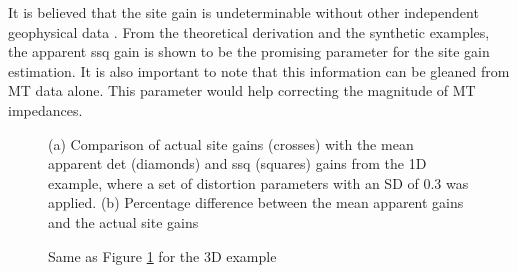 	It is believed that the site gain is undeterminable without other independent geophysical data \citep[e.g.,][]{groom1993a, bibby2005a}.
	From the theoretical derivation and the synthetic examples, the apparent ssq gain is shown to be the promising parameter for the site gain estimation. 
	It is also important to note that this information can be gleaned from MT data alone.
	This parameter would help correcting the magnitude of MT impedances.	

\begin{figure}[t]
	\centering
	\caption[Comparison of the actual and the mean apparent gains from 1D dataset]{(a) Comparison of actual site gains (crosses) with the mean apparent det (diamonds) and ssq (squares) gains from the 1D example, where a set of distortion parameters with an SD of 0.3 was applied. (b) Percentage difference between the mean apparent gains and the actual site gains}
	\label{fig:appgain_1d_site}
\end{figure}

\begin{figure}[t]
	\centering
	\caption{Same as Figure \ref{fig:appgain_1d_site} for the 3D example}
	\label{fig:appgain_3d_site}
\end{figure}
